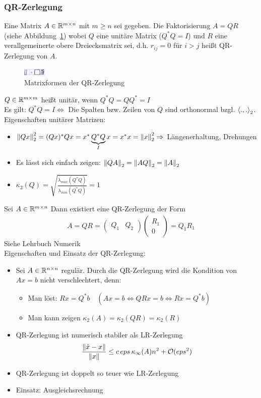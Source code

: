 \subsubsection{QR-Zerlegung}
 Eine Matrix $A \in \mathbb{R}^{m \times n}$ mit $m \geq n$ sei gegeben. Die Faktorisierung $A = QR$ (siehe Abbildung~\ref{fig:qr}) wobei $Q$
eine unitäre Matrix ($Q^*Q=I$) und $R$ eine verallgemeinerte obere Dreiecksmatrix sei, 
d.h. $r_{ij} = 0$ für $i > j$ heißt QR-Zerlegung von $A$.
\begin{figure}
  \centering
  \includegraphics[width=0.1\textwidth]{figures/qr.png}
  \caption{Matrixformen der QR-Zerlegung}
  \label{fig:qr}
\end{figure}
 $Q \in \mathbb{R}^{m \times m}$ heißt unitär, wenn $Q^*Q=QQ^*=I$\\
Es gilt: $Q^*Q=I \Leftrightarrow$ Die Spalten bzw. Zeilen von $Q$ sind orthonormal bzgl. $\left\langle ., . \right\rangle_2$.\\
Eigenschaften unitärer Matrizen:
\begin{itemize}
  \item $\left\lVert Qx \right\rVert_2^2 = (Qx)^*Qx = x^*\underbrace{Q^*Q}_{I}x = x^*x = \left\lVert x \right\rVert_2^2 \Rightarrow$ Längenerhaltung, Drehungen
  \item Es lässt sich einfach zeigen: $\left\lVert QA \right\rVert_2 = \left\lVert AQ \right\rVert_2 = \left\lVert A \right\rVert_2$
  \item $\kappa_2(Q) = \sqrt{\frac{\lambda_{max}(Q^*Q)}{\lambda_{min}(Q^*Q)}} = 1$
\end{itemize}
\satz Sei $A \in \mathbb{R}^{m \times n}$ Dann existiert eine QR-Zerlegung der Form 
\begin{align*}
  A=QR=\begin{pmatrix} Q_1 & Q_2 \end{pmatrix} \begin{pmatrix} R_1 \\ 0 \end{pmatrix} = Q_1 R_1
\end{align*}
\beweis Siehe Lehrbuch Numerik\\
Eigenschaften und Einsatz der QR-Zerlegung:
\begin{itemize}
  \item Sei $A \in \mathbb{R}^{n \times n}$ regulär. Durch die QR-Zerlegung wird die Kondition von $Ax=b$ nicht verschlechtert, denn:
    \begin{itemize}
      \item Man löst: $Rx = Q^*b \quad (Ax = b \Leftrightarrow QRx = b \Leftrightarrow Rx = Q^*b)$
      \item Man kann zeigen $\kappa_2(A) = \kappa_2(QR) = \kappa_2(R)$
    \end{itemize}
  \item QR-Zerlegung ist numerisch stabiler als LR-Zerlegung \begin{align*}
      \frac{\left\lVert \hat{x} - x \right\rVert}{\left\lVert x \right\rVert} \leq c\,eps\,\kappa_\infty(A)n^2 + \mathcal{O}(eps^2)
    \end{align*}
  \item QR-Zerlegung ist doppelt so teuer wie LR-Zerlegung
  \item Einsatz: Ausgleichsrechnung
\end{itemize}
